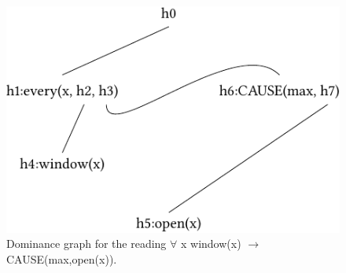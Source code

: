 \begin{figure}
\centering

\includegraphics{Figures/solution-mrs-all-cause-open-cropped.pdf}
\caption{Dominance graph for the reading $\forall$ x window(x) $\to$ CAUSE(max,open(x)).\label{fig-alle-cause}}
\end{figure}%
